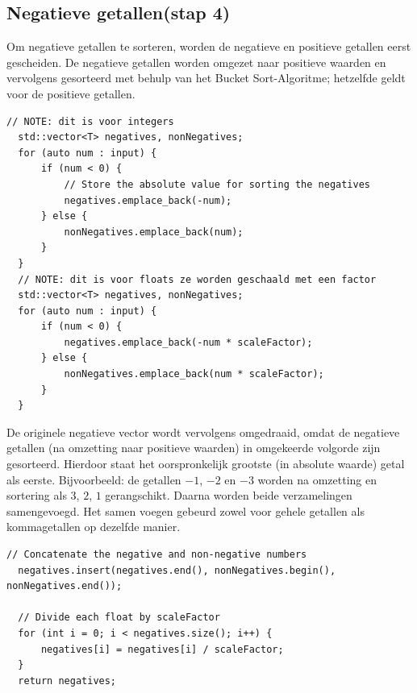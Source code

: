 \documentclass{article}
\begin{document}
\subsection{Negatieve getallen(stap 4)}
Om negatieve getallen te sorteren, worden de negatieve en positieve getallen eerst gescheiden.  
De negatieve getallen worden omgezet naar positieve waarden en vervolgens gesorteerd met behulp van het Bucket Sort-Algoritme; 
hetzelfde geldt voor de positieve getallen.
\newpage
\begin{lstlisting}[caption={Negatieve getallen}, label={lst:negatives}]
  // NOTE: dit is voor integers
  std::vector<T> negatives, nonNegatives;
  for (auto num : input) {
      if (num < 0) {
          // Store the absolute value for sorting the negatives
          negatives.emplace_back(-num);
      } else {
          nonNegatives.emplace_back(num);
      }
  }
  // NOTE: dit is voor floats ze worden geschaald met een factor
  std::vector<T> negatives, nonNegatives;
  for (auto num : input) {
      if (num < 0) {
          negatives.emplace_back(-num * scaleFactor);
      } else {
          nonNegatives.emplace_back(num * scaleFactor);
      }
  }
\end{lstlisting}

De originele negatieve vector wordt vervolgens omgedraaid, 
omdat de negatieve getallen (na omzetting naar positieve waarden) in omgekeerde volgorde zijn gesorteerd. 
Hierdoor staat het oorspronkelijk grootste (in absolute waarde) getal als eerste.  
Bijvoorbeeld: de getallen \(-1\), \(-2\) en \(-3\) worden na omzetting en sortering als \(3\), \(2\), \(1\) gerangschikt. 
Daarna worden beide verzamelingen samengevoegd. Het samen voegen gebeurd zowel voor gehele getallen als kommagetallen op dezelfde manier.
\begin{lstlisting}[caption={getallen samenvoegen}, label={lst:negatives}]
  // Concatenate the negative and non-negative numbers
  negatives.insert(negatives.end(), nonNegatives.begin(), nonNegatives.end());

  // Divide each float by scaleFactor
  for (int i = 0; i < negatives.size(); i++) {
      negatives[i] = negatives[i] / scaleFactor;
  }
  return negatives;  
\end{lstlisting}
\end{document}
